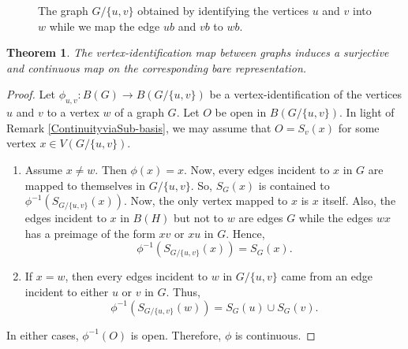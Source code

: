 \documentclass{amsart}
\newtheorem{theorem}{Theorem}[section]
\theoremstyle{definition}
\theoremstyle{remark}
\numberwithin{equation}{section}
\begin{document}
	\begin{figure}
		\centering
		\caption{The graph \(G/\{u,v\}\) obtained by identifying the vertices \(u\) and \(v\) into \(w\) while we map the edge \(ub\) and \(vb\) to \(wb\).}
	\end{figure}
	
	\begin{theorem}
		\label{VertexIdentificationisContinuous}
		The vertex-identification map between graphs induces a surjective and continuous map on the corresponding bare representation.
	\end{theorem}
	\begin{proof}
		Let \(\phi_{u,v}:B(G) \rightarrow B(G / \{u,v\})\) be a vertex-identification of the
		vertices \(u\) and \(v\) to a vertex \(w\) of a graph \(G\). Let \(O\) be open in
		\(B(G/\{u,v\})\). In light of Remark \ref{ContinuityviaSub-basis}, we may assume
		that \(O=S_v(x)\) for some vertex \(x \in V(G / \{u,v\})\).
		\begin{enumerate}
			\item Assume \(x \neq w\). Then \(\phi(x) =x\). Now, every edges incident to \(x\) in \(G\) are mapped to themselves in \(G/\{u,v\}\). So, \(S_G(x)\) is contained to \( \phi^{-1}(S_{G / \{u,v\}}(x))\).	Now, the only vertex mapped to \(x\) is \(x\) itself. Also, the edges incident to \(x\) in \(B(H)\) but not to \(w\) are edges \(G\) while the edges \(wx\) has a preimage of the form \(xv\) or \(xu\) in \(G\). Hence,
			\[\phi^{-1}(S_{G / \{u,v\}}(x)) = S_G(x).\]
			\item If \(x = w\), then every edges incident to \(w\) in
			\(G/\{u,v\}\) came from an edge incident to either \(u\) or \(v\) in \(G\). Thus,
			\[\phi^{-1}(S_{G / \{u,v\}}(w)) = S_G(u) \cup S_G(v).\]
		\end{enumerate}
		In either cases, \(\phi^{-1}(O)\) is open. Therefore, \(\phi\) is
		continuous.
	\end{proof}
	
\end{document}
